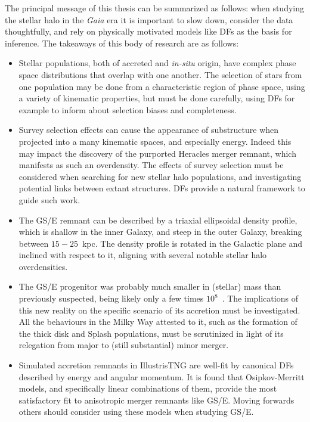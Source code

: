 The principal message of this thesis can be summarized as follows: when studying the stellar halo in the \textit{Gaia} era it is important to slow down, consider the data thoughtfully, and rely on physically motivated models like DFs as the basis for inference. The takeaways of this body of research are as follows:

\begin{itemize}
    \item Stellar populations, both of accreted and \textit{in-situ} origin, have complex phase space distributions that overlap with one another. The selection of stars from one population may be done from a characteristic region of phase space, using a variety of kinematic properties, but must be done carefully, using DFs for example to inform about selection biases and completeness.
    \item Survey selection effects can cause the appearance of substructure when projected into a many kinematic spaces, and especially energy. Indeed this may impact the discovery of the purported Heracles merger remnant, which manifests as such an overdensity. The effects of survey selection must be considered when searching for new stellar halo populations, and investigating potential links between extant structures. DFs provide a natural framework to guide such work.
    \item The GS/E remnant can be described by a triaxial ellipsoidal density profile, which is shallow in the inner Galaxy, and steep in the outer Galaxy, breaking between $15-25$~kpc. The density profile is rotated in the Galactic plane and inclined with respect to it, aligning with several notable stellar halo overdensities.
    \item The GS/E progenitor was probably much smaller in (stellar) mass than previously suspected, being likely only a few times $10^{8}$~\Msun. The implications of this new reality on the specific scenario of its accretion must be investigated. All the behaviours in the Milky Way attested to it, such as the formation of the thick disk and Splash populations, must be scrutinized in light of its relegation from major to (still substantial) minor merger.
    \item Simulated accretion remnants in IllustrisTNG are well-fit by canonical DFs described by energy and angular momentum. It is found that Osipkov-Merritt models, and specifically linear combinations of them, provide the most satisfactory fit to anisotropic merger remnants like GS/E. Moving forwards others should consider using these models when studying GS/E.
\end{itemize}

